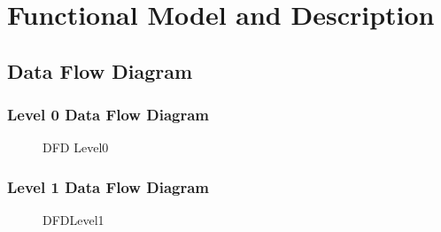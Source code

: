 \documentclass[a4paper,14pt,onecolumn]{report}
\begin{document}
	
	
	\section{Functional Model and Description}   
	\subsection{Data Flow Diagram}  
	\newpage
	\subsubsection{Level 0 Data Flow Diagram}
	\begin{center}
		\begin{figure}[!htbp]
			\centering
			\caption{DFD Level0}
			\label{fig:DFDLevel0}
		\end{figure}
	\end{center} 
	\subsubsection{Level 1 Data Flow Diagram}
	\begin{center}
		\begin{figure}[!htbp]
			\centering
			\caption{DFDLevel1}
			\label{fig:DFDLevel1}
		\end{figure}
	\end{center} 
\end{document}

